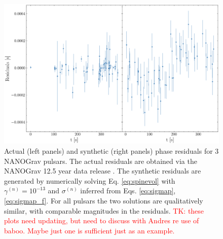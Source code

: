 \documentclass[fleqn,usenatbib,useAMS]{mnras}
\begin{document}
\begin{figure}
	\includegraphics[width=\columnwidth]{images/example_residuals_plot}
	\caption{Actual (left panels) and synthetic (right panels) phase residuals for 3 NANOGrav pulsars. The actual residuals are obtained via the NANOGrav 12.5 year data release \citep{nanograv_narrowband_DR}. The synthetic residuals are generated by numerically solving Eq. \ref{eq:spinevol} with $\gamma^{(n)} = 10^{-13}$ and $\sigma^{(n)}$ inferred from Eqs. \ref{eq:sigmap}, \ref{eq:sigmap_f}. For all pulsars the two solutions are qualitatively similar, with comparable magnitudes in the residuals. \textcolor{red}{TK: these plots need updating, but need to discuss with Andres re use of baboo. Maybe just one is sufficient just as an example.}}
	\label{fig:qualitative_compare}
\end{figure}






%
%	
\end{document}

